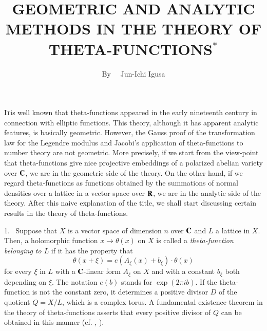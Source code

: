 \title{GEOMETRIC AND ANALYTIC METHODS IN THE THEORY OF THETA-FUNCTIONS$^{*}$}

\author{By~~ Jun-Ichi Igusa}

\date{}

\maketitle

\setcounter{pageoriginal}{240}
\textsc{It}\pageoriginale is well known that theta-functions appeared in the early nineteenth century in connection with elliptic functions. This theory, although it has apparent analytic features, is basically geometric. However, the Gauss proof of the transformation law for the Legendre modulus and Jacobi's application of theta-functions to number theory are not geometric. More precisely, if we start from the view-point that theta-functions give nice projective embeddings of a polarized abelian variety over $\mathbf{C}$, we are in the geometric side of the theory. On the other hand, if we regard theta-functions as functions obtained by the summations of normal densities over a lattice in a vector space over $\mathbf{R}$, we are in the analytic side of the theory. After this naive explanation of the title, we shall start discussing certain results in the theory of theta-functions.

1.~ Suppose that $X$ is a vector space of dimension $n$ over $\mathbf{C}$ and $L$ a lattice in $X$. Then, a holomorphic function $x\to \theta(x)$ on $X$ is called a {\em theta-function belonging to $L$} if it has the property that
$$
\theta(x+\xi)=e(A_{\xi}(x)+b_{\xi})\cdot \theta(x)
$$
for every $\xi$ in $L$ with a $\mathbf{C}$-linear form $A_{\xi}$ on $X$ and with a constant $b_{\xi}$ both depending on $\xi$. The notation $e(b)$ stands for $\exp(2\pi ib)$. If the theta-function is not the constant zero, it determines a positive divisor $D$ of the quotient $Q=X/L$, which is a complex torus. A fundamental existence theorem in the theory of theta-functions asserts that every positive divisor of $Q$ can be obtained in this manner (cf. \cite{art12-key23}, \cite{art12-key24}).

